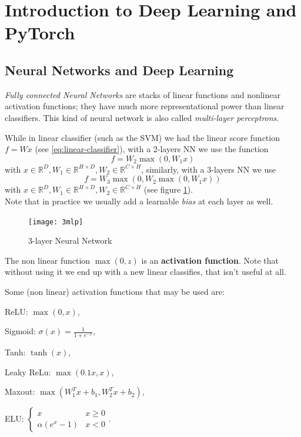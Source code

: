 \section{Introduction to Deep Learning and PyTorch}\label{sec:deep-learning}

\subsection{Neural Networks and Deep Learning}\label{sec:dl-nn}

\textit{Fully connected Neural Networks} are stacks of linear functions and nonlinear activation functions; they have much more representational power than linear classifiers. This kind of neural network is also called \textit{multi-layer perceptrons}.

While in linear classifier (such as the SVM) we had the linear score function $f = Wx$ (see \ref{eq:linear-classifier}), with a 2-layers NN we use the function
\begin{equation}\label{eq:2-mlp}
f = W_2 \max(0, W_1 x)
\end{equation}
with $x \in \mathbb{R}^D, W_1 \in \mathbb{R}^{H \times D}, W_2 \in \mathbb{R}^{C \times H}$, similarly, with a 3-layers NN we use
\begin{equation}\label{eq:3-mlp}
f = W_3 \max(0, W_2 \max(0, W_1 x))
\end{equation}
with $x \in \mathbb{R}^D, W_1 \in \mathbb{R}^{H \times D}, W_2 \in \mathbb{R}^{C \times H}$ (see figure \ref{fig:3mlp}).\\
Note that in practice we usually add a learnable \textit{bias} at each layer as well.

\begin{figure}[!h]
    \centering
    \texttt{[image: 3mlp]}
    \caption[3-layer Neural Network]{3-layer Neural Network}
    \label{fig:3mlp}
\end{figure}

The non linear function $\max(0,z)$ is an \textbf{activation function}. Note that without using it we end up with a new linear classifies, that isn't useful at all.

Some (non linear) activation functions that may be used are: \label{dl-activation}
\begin{myitem}
    \item ReLU: $\max(0,x)$,
    \item Sigmoid: $\sigma(x) = \frac{1}{1 + e^{-x}}$,
    \item Tanh: $\tanh(x)$,
    \item Leaky ReLu: $\max(0.1x,x)$,
    \item Maxout: $\max(W_1^T x + b_1, W_2^T x + b_2)$,
    \item ELU:
    $\begin{cases}
    x              &x \geq 0\\
    \alpha(e^x -1) &x < 0
    \end{cases}$.
\end{myitem}

